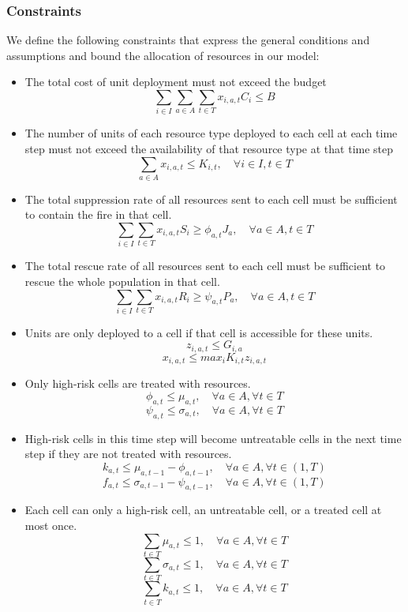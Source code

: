\subsubsection{Constraints}
We define the following constraints that express the general conditions and assumptions
and bound the allocation of resources in our model: 

\begin{itemize}
    \item The total cost of unit deployment must not exceed the budget 
    $$\sum_{i \in I} \sum_{a \in A} \sum_{t \in T} x_{i,a,t} C_i \leq B $$

    \item The number of units of each resource type deployed to each cell at each time step 
    must not exceed the availability of that resource type at that time step
    $$\sum_{a \in A} x_{i,a,t} \leq K_{i,t}, \quad \forall i \in I, t \in T$$

    \item The total suppression rate of all resources sent to each cell
    must be sufficient to contain the fire in that cell. 
    $$\sum_{i \in I} \sum_{t \in T} x_{i,a,t} S_i \geq \phi_{a,t} J_a, \quad \forall a \in A, t \in T$$

    \item The total rescue rate of all resources sent to each cell
    must be sufficient to rescue the whole population in that cell. 
    $$\sum_{i \in I} \sum_{t \in T} x_{i,a,t} R_i \geq \psi_{a,t} P_a, \quad \forall a \in A, t \in T$$

    \item Units are only deployed to a cell if that cell is accessible for these units. 
    $$z_{i,a,t} \leq G_{i,a} $$
    $$x_{i,a,t} \leq max_{i}K_{i,t} z_{i,a,t}$$

    \item Only high-risk cells are treated with resources. 
    $$\phi_{a,t} \leq \mu_{a,t}, \quad \forall a \in A, \forall t \in T$$
    $$\psi_{a,t} \leq \sigma_{a,t}, \quad \forall a \in A, \forall t \in T$$

    \item High-risk cells in this time step will become untreatable cells in the next time step
    if they are not treated with resources.
    $$k_{a,t} \leq \mu_{a,t-1} - \phi_{a,t-1}, \quad \forall a \in A, \forall t \in (1,T)$$
    $$f_{a,t} \leq \sigma_{a,t-1} - \psi_{a,t-1}, \quad \forall a \in A, \forall t \in (1,T)$$

    \item Each cell can only a high-risk cell, an untreatable cell, or a treated cell at most once.
    $$\sum_{t \in T} \mu_{a,t} \leq 1, \quad \forall a \in A, \forall t \in T$$ 
    $$\sum_{t \in T} \sigma_{a,t} \leq 1, \quad \forall a \in A, \forall t \in T$$
    $$\sum_{t \in T} k_{a,t} \leq 1, \quad \forall a \in A, \forall t \in T$$ 


\end{itemize}
